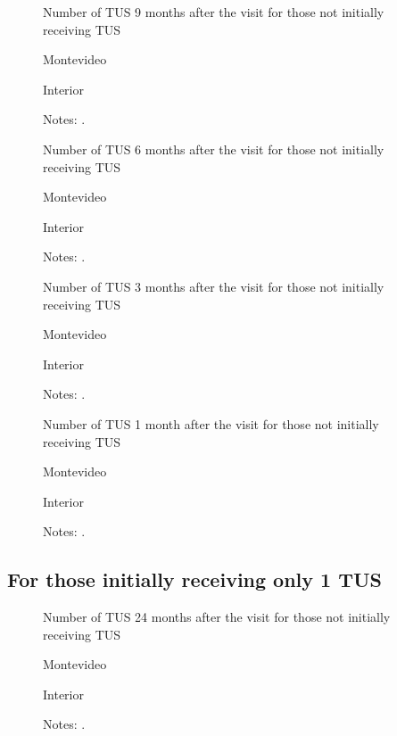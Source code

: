 \documentclass[12pt]{article}
\begin{document}
\begin{figure}[H]%
	\caption{Number of TUS 9 months after the visit for those not initially receiving TUS}%
	\centering
	\caption*{ {Montevideo}}
	\qquad
	\caption*{Interior}
	\label{fig:first_stage_noTus_tus9}%
	\caption*{ {\footnotesize Notes: .}}
\end{figure}

\begin{figure}[H]%
	\caption{Number of TUS 6 months after the visit for those not initially receiving TUS}%
	\centering
	\caption*{ {Montevideo}}
	\qquad
	\caption*{Interior}
	\label{fig:first_stage_noTus_tus6}%
	\caption*{ {\footnotesize Notes: .}}
\end{figure}

\begin{figure}[H]%
	\caption{Number of TUS 3 months after the visit for those not initially receiving TUS}%
	\centering
	\caption*{ {Montevideo}}
	\qquad
	\caption*{Interior}
	\label{fig:first_stage_noTus_tus3}%
	\caption*{ {\footnotesize Notes: .}}
\end{figure}

\begin{figure}[H]%
	\caption{Number of TUS 1 month after the visit for those not initially receiving TUS}%
	\centering
	\caption*{ {Montevideo}}
	\qquad
	\caption*{Interior}
	\label{fig:first_stage_noTus_tus1}%
	\caption*{ {\footnotesize Notes: .}}
\end{figure}

\subsection{For those initially receiving only 1 TUS}

\begin{figure}[H]%
	\caption{Number of TUS 24 months after the visit for those not initially receiving TUS}%
	\centering
	\caption*{ {Montevideo}}
	\qquad
	\caption*{Interior}
	\label{fig:first_stage_si1Tus_tus24}%
	\caption*{ {\footnotesize Notes: .}}
\end{figure}
\end{document}
